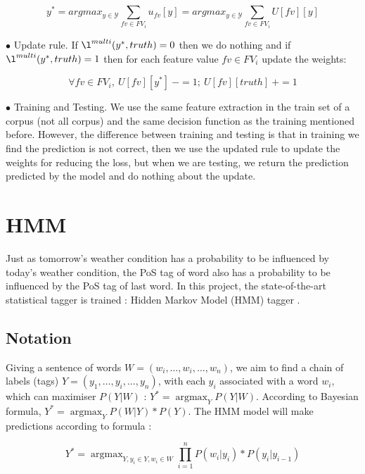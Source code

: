 \documentclass{article}
\def\YY{{\mathcal{Y}}}
\begin{document}
\begin{equation}
y^* = argmax_{y \in \YY} \sum_{fv \in FV_i} {u_{fv}[y]}
= argmax_{y \in \YY} \sum_{fv \in FV_i} {U[fv][y]}
\end{equation}

$\bullet$ Update rule. If $\l^{multi}(y^*, truth) = 0$ then we do nothing and if $\l^{multi}(y^*, truth) = 1$ then for each feature value $fv \in FV_i$ update the weights:

\begin{equation}
\forall fv \in FV_i,\  U[fv][y^*]\ -= 1;\ U[fv][truth]\ += 1
\end{equation} 

$\bullet$ Training and Testing. We use the same feature extraction in the train set of a corpus (not all corpus) and the same decision function as the training mentioned before. However, the difference between training and testing is that in training we find the prediction is not correct, then we use the updated rule to update the weights for reducing the loss, but when we are testing, we return the prediction predicted by the model and do nothing about the update.

\section{HMM}
Just as tomorrow's weather condition has a probability to be influenced by today's weather condition, the PoS tag of word also has a probability to be influenced by the PoS tag of last word. 
In this project, the state-of-the-art statistical tagger is trained : Hidden Markov Model (HMM) tagger \cite{charniak1993equations}.

\subsection{Notation}

Giving a sentence of words $W = (w_i,\dots,w_i,\dots,w_n)$, we aim to find a chain of labels (tags) $Y = (y_1,\dots,y_i,\dots,y_n)$, with each $y_i$ associated with a word $w_i$, which can maximiser $P(Y|W)$ : $Y^* = \mathop{\arg\max}_{Y} P(Y|W)$. According to Bayesian formula, $Y^* = \mathop{\arg\max}_{Y} P(W|Y)*P(Y)$. The HMM model will make predictions according to formula :

\begin{equation}
Y^* = \mathop{\arg\max}_{Y, y_i \in Y, w_i \in W} \prod_{i=1}^n P(w_i|y_i)*P(y_i|y_{i-1})
\label{hmm_formula}
\end{equation}
\end{document}
